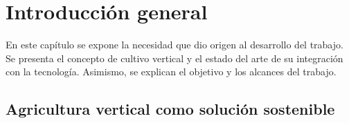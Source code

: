 
\chapter{Introducción general} %

\label{Chapter1} %
\label{IntroGeneral}

En este capítulo se expone la necesidad que dio origen al desarrollo del trabajo. Se presenta el concepto de cultivo vertical y el estado del arte de su integración con la tecnología. Asimismo, se explican el objetivo y los alcances del trabajo.


\newcommand{\keyword}[1]{\textbf{#1}}
\newcommand{\tabhead}[1]{\textbf{#1}}
\newcommand{\code}[1]{\texttt{#1}}
\newcommand{\file}[1]{\texttt{\bfseries#1}}
\newcommand{\option}[1]{\texttt{\itshape#1}}
\newcommand{\grados}{$^{\circ}$}



\section{Agricultura vertical como solución sostenible}


